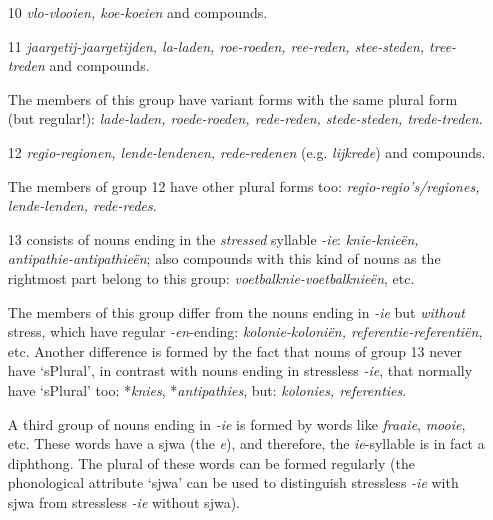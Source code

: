 \begin{itemize}
            {\em Vederen} might be the plural of {\em veer}, but it is also 
            possible that {\em vederen} is the plural of {\em veder} only,
            and that {\em veren} is the (only) plural of {\em veer}.

  \item [10] {\em vlo-vlooien, koe-koeien} and compounds.

  \item [11] {\em jaargetij-jaargetijden, la-laden, roe-roeden, ree-reden, 
             stee-steden, tree-treden} and compounds.

             The members of this group have variant forms with the same 
             plural form (but regular!): {\em lade-laden, 
             roede-roeden, rede-reden, stede-steden, trede-treden}.

  \item [12] {\em regio-regionen, lende-lendenen, rede-redenen} (e.g. 
             {\em lijkrede}) and compounds.

             The members of group 12 have other plural forms too: 
             {\em regio-regio's/regiones, lende-lenden, rede-redes}.

  \item [13] consists of nouns ending in the {\em stressed} syllable {\em -ie}: 
             {\em knie-knie\"{e}n, antipathie-antipathie\"{e}n}; 
             also compounds with 
             this kind of nouns as the rightmost part belong to this group: 
             {\em voetbal{\em knie}-voetbal{\em knie\"{e}n}}, etc. 

             The members of this group differ from the nouns ending in 
             {\em -ie} but 
             {\em without} stress, which have regular {\em -en}-ending: 
             {\em kolonie-koloni\"{e}n, referentie-referenti\"{e}n}, etc.
             Another difference is formed by the fact that nouns of group 13 
             never have `sPlural', in contrast with nouns ending in stressless 
             {\em -ie}, that normally have `sPlural' too: *{\em knies}, 
             *{\em antipathies}, 
             but: {\em kolonies, referenties}. 

             A third group of nouns ending in {\em -ie} is formed by words like 
             {\em fraaie}, {\em mooie}, etc. These words have a sjwa 
             (the {\em e}), and therefore, the {\em ie}-syllable is in fact a 
             diphthong. The plural of these words can be formed regularly (the 
             phonological attribute `sjwa' can be used to distinguish 
             stressless {\em -ie} with sjwa from stressless {\em -ie} 
             without sjwa).


\end{itemize}
